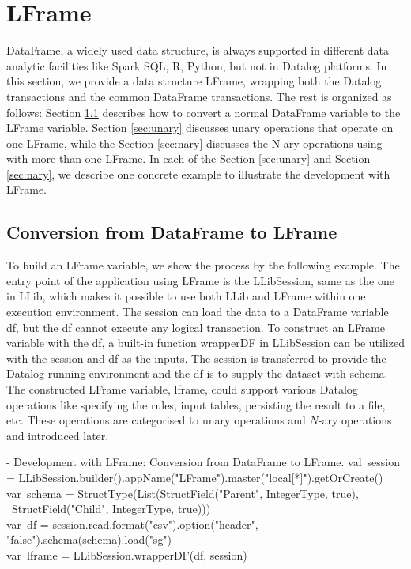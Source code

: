 \eldl

\section{LFrame}
\label{lframe}
DataFrame, a widely used data structure, is always supported in different data analytic facilities like Spark SQL, R, Python, but not in Datalog platforms. In this section, we provide a data structure LFrame, wrapping both the Datalog transactions and the common DataFrame transactions. The rest is organized as follows: Section \ref{sec:utility} describes how to convert a normal DataFrame variable to the LFrame variable. Section  \ref{sec:unary} discusses unary operations that operate on one LFrame, while the Section \ref{sec:nary} discusses the N-ary operations using with more than one  LFrame. In each of the Section \ref{sec:unary} and Section  \ref{sec:nary}, we describe one concrete example to illustrate the development with LFrame.



\subsection{Conversion from DataFrame to LFrame}
\label{sec:utility}
To build an LFrame variable, we show the process by the following example.
The entry point of the application using LFrame is the LLibSession, same as the one in LLib, which makes it possible to use both LLib and LFrame within one execution environment. 
The session can  load the data to a DataFrame variable df, but the df cannot execute any logical transaction. To construct an LFrame variable with the  df, a built-in function wrapperDF in LLibSession can be utilized with the session and df as the inputs. 
The session is transferred to provide the Datalog running environment and the df is to supply the dataset with schema.  
The constructed LFrame variable, lframe, could support various Datalog operations like specifying the rules, input tables, persisting the result to a file, etc. These operations are categorised to unary operations and $N$-ary operations and introduced later.

\vspace{0.5em}
 - Development with LFrame:  Conversion from DataFrame to LFrame.
\bldl
val\ session = LLibSession.builder().appName("LFrame").master("local[*]").getOrCreate() \\
var\ schema = StructType(List(StructField("Parent", IntegerType, true),\\ \ StructField("Child", IntegerType, true)))\\
var\ df = session.read.format("csv").option("header", "false").schema(schema).load("sg")\\
var\ lframe = LLibSession.wrapperDF(df, session)
\eldl

